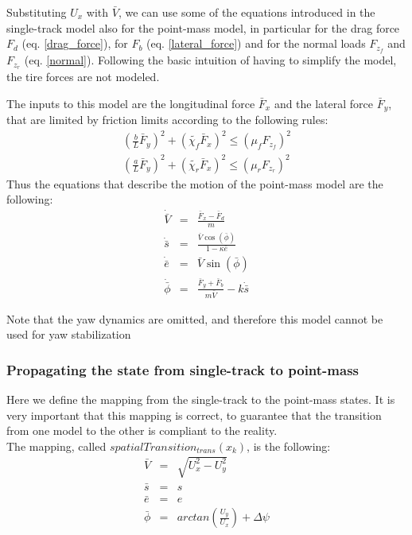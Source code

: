 \documentclass[a4paper, onecolumn, 11pt]{article}
\begin{document}
Substituting ${U}_x$ with $\bar{V}$, we can use some of the equations introduced in the single-track model also for the point-mass model,
in particular for the drag force ${F}_d$ (eq. \ref{drag_force}), for ${F}_b$ (eq. \ref{lateral_force}) and for the normal loads ${F}_{z_f}$ and ${F}_{z_r}$ (eq. \ref{normal}).
Following the basic intuition of having to simplify the model, the tire forces are not modeled.

The inputs to this model are the longitudinal force $\bar{F}_x$ and the lateral force $\bar{F}_y$, that are limited by friction limits
according to the following rules:
\begin{subequations}
    \begin{eqnarray} 
        \left(\frac{b}{L}\bar{F}_y\right)^2 + \left(\tilde{\chi_f}\bar{F}_x\right)^2 \leq \left(\mu_f F_{z_f}\right)^2 \\
        \left(\frac{a}{L}\bar{F}_y\right)^2 + \left(\tilde{\chi_r}\bar{F}_x\right)^2 \leq \left(\mu_r F_{z_r}\right)^2
    \end{eqnarray}
\end{subequations}
Thus the equations that describe the motion of the point-mass model are the following:
\begin{subequations}
    \begin{eqnarray}
        \dot{\bar{V}} &=& \frac{\bar{F}_{x}-\bar{F}_{d}}{m}\\
        \dot{\bar{s}} &=& \frac{\bar{V}\cos(\bar{\phi})}{1-\kappa \bar{e}}\\
        \dot{\bar{e}} &=& \bar{V}\sin(\bar{\phi})\\
        \dot{\bar{\phi}} &=& \frac{{\bar{F}}_y + {\bar{F}}_b}{m\bar{V}} - k\dot{\bar{s}}
    \end{eqnarray}
\end{subequations}

Note that the yaw dynamics are omitted, and therefore this model cannot be used for yaw stabilization

\subsubsection{Propagating the state from single-track to point-mass}
Here we define the mapping from the single-track to the point-mass states. 
It is very important that this mapping is correct, to guarantee that the transition
from one model to the other is compliant to the reality.\\
The mapping, called $spatialTransition_{trans}(x_k)$, is the following:
\begin{subequations}
    \begin{eqnarray}
        \bar{V} &=& \sqrt{U_{x}^{2}-U_{y}^{2}}\\
        \bar{s} &=& s\\
        \bar{e} &=& e\\
        \bar{\phi} &=& arctan\left(\frac{{U}_y}{{U}_x}\right) + \Delta\psi
    \end{eqnarray}
\end{subequations}
\end{document}
